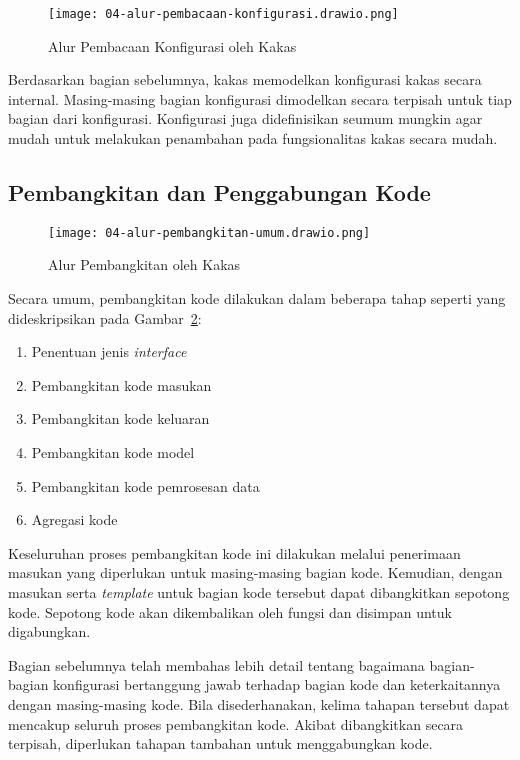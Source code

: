 \begin{figure}[H]
    \centering
    \texttt{[image: 04-alur-pembacaan-konfigurasi.drawio.png]}
    \caption{Alur Pembacaan Konfigurasi oleh Kakas}\label{fig:04-flowchart-config-read}
\end{figure}

Berdasarkan bagian sebelumnya, kakas memodelkan konfigurasi kakas secara internal.
Masing-masing bagian konfigurasi dimodelkan secara terpisah untuk tiap bagian dari konfigurasi.
Konfigurasi juga didefinisikan seumum mungkin agar mudah untuk melakukan penambahan pada fungsionalitas kakas secara mudah.


\subsection{Pembangkitan dan Penggabungan Kode}

\begin{figure}[H]
    \centering
    \texttt{[image: 04-alur-pembangkitan-umum.drawio.png]}
    \caption{Alur Pembangkitan oleh Kakas}\label{fig:04-flowchart-code-generation}
\end{figure}

Secara umum, pembangkitan kode dilakukan dalam beberapa tahap seperti yang dideskripsikan pada Gambar~\ref{fig:04-flowchart-code-generation}:
\begin{enumerate}
    \item Penentuan jenis \textit{interface}
    \item Pembangkitan kode masukan
    \item Pembangkitan kode keluaran
    \item Pembangkitan kode model
    \item Pembangkitan kode pemrosesan data
    \item Agregasi kode
\end{enumerate}

Keseluruhan proses pembangkitan kode ini dilakukan melalui penerimaan masukan yang diperlukan untuk masing-masing bagian kode.
Kemudian, dengan masukan serta \textit{template} untuk bagian kode tersebut dapat dibangkitkan sepotong kode.
Sepotong kode akan dikembalikan oleh fungsi dan disimpan untuk digabungkan. 

Bagian sebelumnya telah membahas lebih detail tentang bagaimana bagian-bagian konfigurasi bertanggung jawab terhadap bagian kode dan keterkaitannya dengan masing-masing kode.
Bila disederhanakan, kelima tahapan tersebut dapat mencakup seluruh proses pembangkitan kode.
Akibat dibangkitkan secara terpisah, diperlukan tahapan tambahan untuk menggabungkan kode.

